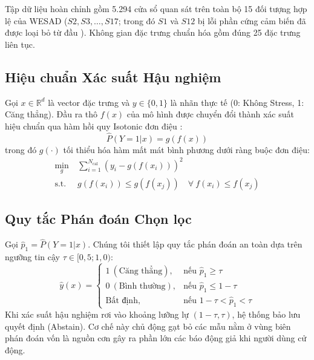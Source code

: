 \documentclass[conference]{IEEEtran}
\begin{document}
Tập dữ liệu hoàn chỉnh gồm 5.294 cửa sổ quan sát trên toàn bộ 15 đối tượng hợp lệ của WESAD ($S2, S3, \dots, S17$; trong đó $S1$ và $S12$ bị lỗi phần cứng cảm biến đã được loại bỏ từ đầu \cite{schmidt2018wesad}). Không gian đặc trưng chuẩn hóa gồm đúng 25 đặc trưng liên tục.

\subsection{Hiệu chuẩn Xác suất Hậu nghiệm}
Gọi $x \in \mathbb{R}^d$ là vector đặc trưng và $y \in \{0, 1\}$ là nhãn thực tế (0: Không Stress, 1: Căng thẳng). Đầu ra thô $f(x)$ của mô hình được chuyển đổi thành xác suất hiệu chuẩn qua hàm hồi quy Isotonic đơn điệu \cite{zadrozny2002transforming, niculescu2005predicting}:
\begin{equation}
\hat{P}(Y=1|x) = g(f(x))
\end{equation}
trong đó $g(\cdot)$ tối thiểu hóa hàm mất mát bình phương dưới ràng buộc đơn điệu:
\begin{equation}
\begin{aligned}
\min_{g} \ & \sum_{i=1}^{N_{\text{cal}}} \left( y_i - g(f(x_i)) \right)^2 \\
\text{s.t.} \ & g(f(x_i)) \le g(f(x_j)) \quad \forall \ f(x_i) \le f(x_j)
\end{aligned}
\end{equation}

\subsection{Quy tắc Phán đoán Chọn lọc}
Gọi $\hat{p}_1 = \hat{P}(Y=1|x)$. Chúng tôi thiết lập quy tắc phán đoán an toàn dựa trên ngưỡng tin cậy $\tau \in [0,5; 1,0)$:
\begin{equation}
\hat{y}(x) =
\begin{cases}
1 \ (\text{Căng thẳng}), & \text{nếu } \hat{p}_1 \ge \tau \\
0 \ (\text{Bình thường}), & \text{nếu } \hat{p}_1 \le 1 - \tau \\
\text{Bất định}, & \text{nếu } 1 - \tau < \hat{p}_1 < \tau
\end{cases}
\end{equation}
Khi xác suất hậu nghiệm rơi vào khoảng lưỡng lự $(1-\tau, \tau)$, hệ thống bảo lưu quyết định (Abstain). Cơ chế này chủ động gạt bỏ các mẫu nằm ở vùng biên phán đoán vốn là nguồn cơn gây ra phần lớn các báo động giả khi người dùng cử động.

\end{document}
